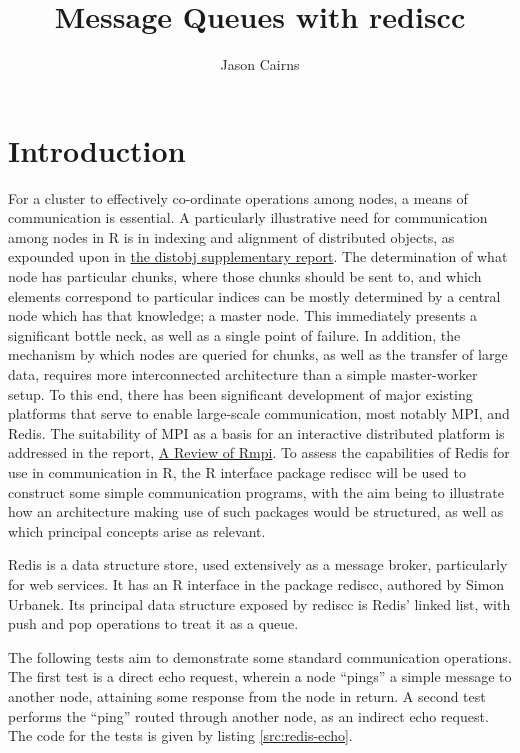\documentclass[10pt,a4paper]{article}
\begin{document}
\title{Message Queues with rediscc}
\author{Jason Cairns}
  
\maketitle{}

\section{Introduction}
For a cluster to effectively co-ordinate operations among nodes, a means of communication is essential.
A particularly illustrative need for communication among nodes in R is in indexing and alignment of distributed objects, as expounded upon in \href{experiment-eager-dist-obj-supp.pdf}{the distobj supplementary report}.
The determination of what node has particular chunks, where those chunks should be sent to, and which elements correspond to particular indices can be mostly determined by a central node which has that knowledge; a master node.
This immediately presents a significant bottle neck, as well as a single point of failure.
In addition, the mechanism by which nodes are queried for chunks, as well as the transfer of large data, requires more interconnected architecture than a simple master-worker setup.
To this end, there has been significant development of major existing platforms that serve to enable large-scale communication, most notably MPI, and Redis\cite{walker1996mpi}\cite{sanfilippo2009redis}.
The suitability of MPI as a basis for an interactive distributed platform is addressed in the report, \href{review-rmpi.pdf}{A Review of Rmpi}.
To assess the capabilities of Redis for use in communication in R, the R interface package rediscc will be used to construct some simple communication programs, with the aim being to illustrate how an architecture making use of such packages would be structured, as well as which principal concepts arise as relevant\cite{yu02:_rmpi}\cite{urbanek2020rediscc}.

Redis is a data structure store, used extensively as a message broker, particularly for web services.
It has an R interface in the package rediscc, authored by Simon Urbanek.
Its principal data structure exposed by rediscc is Redis' linked list, with push and pop operations to treat it as a queue.

The following tests aim to demonstrate some standard communication operations.
The first test is a direct echo request, wherein a node ``pings'' a simple message to another node, attaining some response from the node in return.
A second test performs the ``ping'' routed through another node, as an indirect echo request.
The code for the tests is given by listing \ref{src:redis-echo}.
\end{document}
